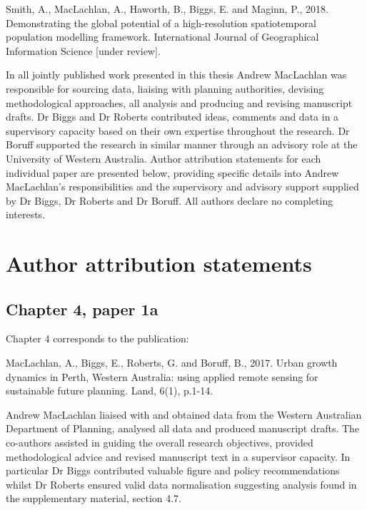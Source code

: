 \documentclass[]{book}
\begin{document}
Smith, A., MacLachlan, A., Haworth, B., Biggs, E. and Maginn, P., 2018.
Demonstrating the global potential of a high-resolution spatiotemporal
population modelling framework. International Journal of Geographical
Information Science {[}under review{]}.

In all jointly published work presented in this thesis Andrew MacLachlan
was responsible for sourcing data, liaising with planning authorities,
devising methodological approaches, all analysis and producing and
revising manuscript drafts. Dr Biggs and Dr Roberts contributed ideas,
comments and data in a supervisory capacity based on their own expertise
throughout the research. Dr Boruff supported the research in similar
manner through an advisory role at the University of Western Australia.
Author attribution statements for each individual paper are presented
below, providing specific details into Andrew MacLachlan's
responsibilities and the supervisory and advisory support supplied by Dr
Biggs, Dr Roberts and Dr Boruff. All authors declare no completing
interests.

\section*{Author attribution
statements}\label{author-attribution-statements}

\subsection*{Chapter 4, paper 1a}\label{chapter-4-paper-1a}

Chapter 4 corresponds to the publication:

MacLachlan, A., Biggs, E., Roberts, G. and Boruff, B., 2017. Urban
growth dynamics in Perth, Western Australia: using applied remote
sensing for sustainable future planning. Land, 6(1), p.1-14.

Andrew MacLachlan liaised with and obtained data from the Western
Australian Department of Planning, analysed all data and produced
manuscript drafts. The co-authors assisted in guiding the overall
research objectives, provided methodological advice and revised
manuscript text in a supervisor capacity. In particular Dr Biggs
contributed valuable figure and policy recommendations whilst Dr Roberts
ensured valid data normalisation suggesting analysis found in the
supplementary material, section 4.7.
\end{document}
